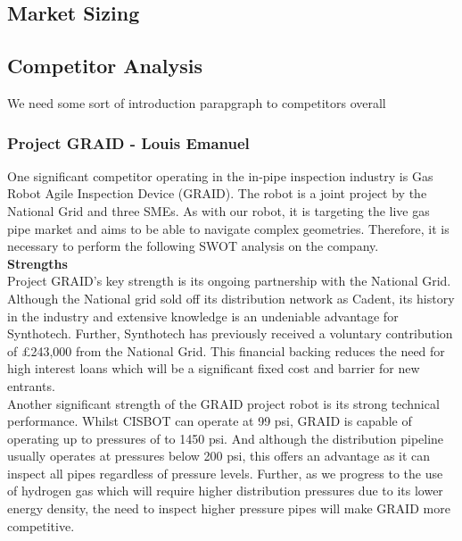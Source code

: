 \documentclass[11pt]{article}		%
\begin{document}
        \subsection{Market Sizing}
        
        \subsection{Competitor Analysis}
        
        We need some sort of introduction parapgraph to competitors overall
		
		\subsubsection[Project GRAID]{Project GRAID - Louis Emanuel}
		
			One significant competitor operating in the in-pipe inspection industry is Gas Robot Agile Inspection Device (GRAID). The robot is a joint project by the National Grid and three SMEs. As with our robot, it is targeting the live gas pipe market and aims to be able to navigate complex geometries. Therefore, it is necessary to perform the following SWOT analysis on the company. \\
			
			\textbf{Strengths} \\
			Project GRAID's key strength is its ongoing partnership with the National Grid. Although the National grid sold off its distribution network as Cadent, its history in the industry and extensive knowledge is an undeniable advantage for Synthotech. Further, Synthotech has previously received a voluntary contribution of £243,000 from the National Grid. This financial backing reduces the need for high interest loans which will be a significant fixed cost and barrier for new entrants. \\
		    \hspace*{3ex}Another significant strength of the GRAID project robot is its strong technical performance. Whilst CISBOT can operate at 99 psi, GRAID is capable of operating up to pressures of to 1450 psi. And although the distribution pipeline usually operates at pressures below 200 psi, this offers an advantage as it can inspect all pipes regardless of pressure levels. Further, as we progress to the use of hydrogen gas which will require higher distribution pressures due to its lower energy density, the need to inspect higher pressure pipes will make GRAID more competitive. 
	        
\end{document}
